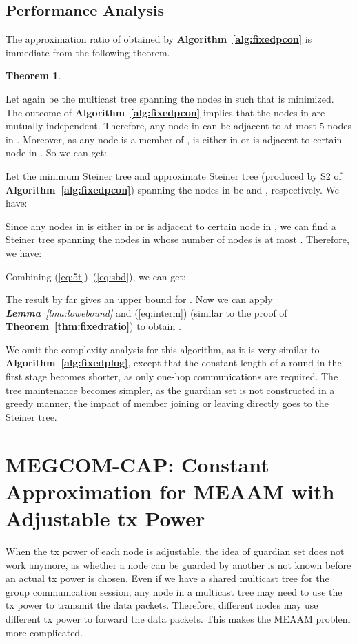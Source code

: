 \documentclass[10pt, conference, compsocconf]{IEEEtran}
\newtheorem{theorem}{\textbf{Theorem}}
\begin{document}
  \subsection{Performance Analysis}
The approximation ratio of  obtained by \textbf{Algorithm~\ref{alg:fixedpcon}} is immediate from the following theorem.
\begin{theorem}
      
      \label{thm:distributed}
    \end{theorem}
\begin{IEEEproof}
Let  again be the multicast tree spanning the nodes in  such that  is minimized. The outcome of \textbf{Algorithm~\ref{alg:fixedpcon}} implies that the nodes in  are mutually independent. Therefore, any node in  can be adjacent to at most 5 nodes in  \cite{Wan2002}. Moreover, as any node  is a member of ,  is either in  or is adjacent to certain node in . So we can get:


      Let the minimum Steiner tree and approximate Steiner tree (produced by S2 of \textbf{Algorithm~\ref{alg:fixedpcon}}) spanning the nodes in  be  and , respectively. We have:


      Since any nodes in  is either in  or is adjacent to certain node in , we can find a Steiner tree spanning the nodes in  whose number of nodes is at most . Therefore, we have:


      Combining (\ref{eq:5t})--(\ref{eq:sbd}), we can get:


      The result by far gives an upper bound for . Now we can apply \textit{\textbf{Lemma}~\ref{lma:lowebound}} and (\ref{eq:interm}) (similar to the proof of \textbf{Theorem~\ref{thm:fixedratio}}) to obtain .
    \end{IEEEproof}

    We omit the complexity analysis for this algorithm, as it is very similar to \textbf{Algorithm~\ref{alg:fixedplog}}, except that the constant length of a round in the first stage becomes shorter, as only one-hop communications are required. The tree maintenance becomes simpler, as the guardian set is not constructed in a greedy manner, the impact of member joining or leaving directly goes to the Steiner tree.


\section{MEGCOM-CAP: Constant Approximation for MEAAM with Adjustable tx Power} \label{sec:conatxp}
When the tx power of each node is adjustable, the idea of guardian set does not work anymore, as whether a node can be guarded by another is not known before an actual tx power is chosen. Even if we have a shared multicast tree for the group communication session, any node  in a multicast tree  may need to use the tx power  to transmit the data packets. Therefore, different nodes may use different tx power to forward the data packets. This makes the MEAAM problem more complicated.
\end{document}
